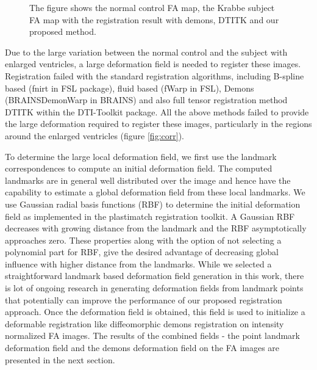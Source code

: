 \documentclass{llncs}
\begin{document}
\begin{figure}
    \label{fig:regMatch}
    \caption{The figure shows the normal control FA map, the Krabbe subject FA map with the registration result with demons, DTITK and our proposed method.}
\end{figure}

Due to the large variation between the normal control and the subject with enlarged ventricles, a large deformation field is needed to register these images. Registration failed with the standard registration algorithms, including B-spline based (fnirt in FSL package), fluid based (fWarp in FSL), Demons (BRAINSDemonWarp in BRAINS) and also full tensor registration method DTITK within the DTI-Toolkit package. All the above methods failed to provide the large deformation required to register these images, particularly in the regions around the enlarged ventricles (figure \ref{fig:corr}).

To determine the large local deformation field, we first use the landmark correspondences to compute an initial deformation field. The computed landmarks are in general well distributed over the image and hence have the capability to estimate a global deformation field from these  local landmarks. We use  Gaussian radial basis functions (RBF) to determine the initial deformation field as implemented in the plastimatch registration toolkit. A Gaussian RBF decreases with growing distance from the landmark and the RBF asymptotically approaches zero. These properties along with the option of not selecting a polynomial part for RBF, give the desired advantage of decreasing global influence with higher distance from the landmarks. While we selected a straightforward landmark based deformation field generation in this work, there is lot of ongoing research in generating deformation fields from landmark points that potentially can improve the performance of our proposed registration approach. Once the deformation field is obtained, this field is used to initialize a deformable registration like diffeomorphic demons registration on intensity normalized FA images. The results of the combined fields - the point landmark deformation field and the demons deformation field on the FA images are presented in the next section.
\end{document}
